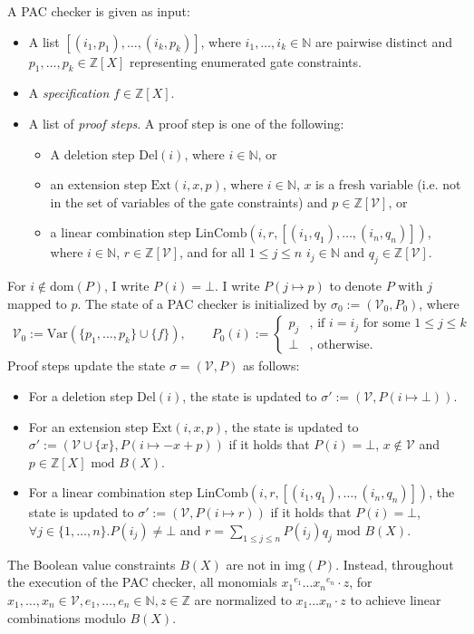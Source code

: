 A PAC checker is given as input:
\begin{itemize}
	\item A list $[(i_1,p_1),\dots,(i_k,p_k)]$, where $i_1,\dots,i_k \in \mathbb{N}$ are pairwise distinct and $p_1, \dots, p_k \in \mathbb{Z}[X]$ representing enumerated gate constraints.
	\item A \textit{specification} $f \in \mathbb{Z}[X]$.
	\item A list of \textit{proof steps}. A proof step is one of the following:
	      \begin{itemize}
		      \item A deletion step $\text{Del} (i)$, where $i \in \mathbb{N}$, or
		      \item an extension step $\text{Ext} (i, x, p)$, where $i \in \mathbb{N}$, $x$ is a fresh variable (i.e. not in the set of variables of the gate constraints) and $p \in \mathbb{Z}[\mathscr{V}]$, or
		      \item a linear combination step $\text{LinComb} (i, r, [(i_1, q_1),  \dots, (i_n, q_n)])$, where
		            $i \in \mathbb{N}$, $r \in  \mathbb{Z}[\mathscr{V}]$, and for all $1 \le j \le n$ $i_j \in \mathbb{N}$ and $q_j \in \mathbb{Z}[\mathscr{V}]$.
	      \end{itemize}
\end{itemize}
For $i \not\in \text{dom}(P)$, I write $P(i) = \bot$.
I write $P(j\mapsto p)$ to denote $P$ with $j$ mapped to $p$.
The state of a PAC checker is initialized by $\sigma_0 := (\mathscr{V}_0, P_0)$, where
\begin{gather*}
	\mathscr{V}_0 := \text{Var}(\{p_1,\dots,p_k\} \cup \{f\}), \qquad
	P_0(i) :=
	\begin{cases}
		p_j  & \text{, if $i = i_j$ for some $1 \le j \le k$} \\
		\bot & \text{, otherwise.}
	\end{cases}
\end{gather*}
Proof steps update the state $\sigma = (\mathscr{V},P)$ as follows:
\begin{itemize}
	\item For a deletion step $\text{Del} (i)$, the state is updated to $\sigma' := (\mathscr{V},P(i\mapsto \bot))$.
	\item   For an extension step $\text{Ext} (i,x,p)$, the state is updated to $\sigma' := (\mathscr{V} \cup \{x\}, P(i \mapsto -x + p))$ if it holds that $P(i) = \bot$, $x \notin \mathscr{V}$ and $p \in \mathbb{Z}[X] \text{ mod } B(X)$.
	\item For a linear combination step $\text{LinComb} (i,r,[(i_1,q_1),\dots,(i_n,q_n)])$, the state is updated to $\sigma' := (\mathscr{V}, P(i \mapsto r))$ if it holds that $P(i) = \bot$, $\forall j \in \{1,\dots,n\}. P(i_j) \neq \bot$ and $r = \sum_{1 \le j\le n}P(i_j)q_j \text{ mod } B(X)$.
\end{itemize}
The Boolean value constraints $B(X)$ are not in $\text{img}(P)$.
Instead, throughout the execution of the PAC checker, all monomials ${x_1}^{e_1} \dots {x_n}^{e_n} \cdot z$, for $x_1,\dots,x_n \in \mathscr{V}, e_1,\dots,e_n \in \mathbb{N}, z \in \mathbb{Z}$ are normalized to $x_1  \dots  x_n \cdot z$ to achieve linear combinations modulo $B(X)$.

